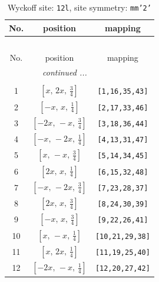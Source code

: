 \documentclass[fleqn,8pt]{jsarticle}
\begin{document}
\begin{longtable}{ccc}
\caption{Wyckoff site: {\tt 12l}, site symmetry: {\tt mm'2'}}
 \\
 \hline \hline
No. & position & mapping \\ \hline \endfirsthead

\multicolumn{2}{l}{\tablename\ \thetable{}} \\
 \hline \hline
No. & position & mapping \\ \hline \endhead

 \hline \hline
\multicolumn{2}{r}{\footnotesize\it continued ...} \\ \endfoot

 \hline \hline
\multicolumn{2}{r}{} \\ \endlastfoot

1 & $\left[ x,\, 2 x,\, \frac{3}{4} \right]$ & {\tt [1,16,35,43]} \\ \hline
2 & $\left[ - x,\, x,\, \frac{1}{4} \right]$ & {\tt [2,17,33,46]} \\ \hline
3 & $\left[ - 2 x,\, - x,\, \frac{3}{4} \right]$ & {\tt [3,18,36,44]} \\ \hline
4 & $\left[ - x,\, - 2 x,\, \frac{1}{4} \right]$ & {\tt [4,13,31,47]} \\ \hline
5 & $\left[ x,\, - x,\, \frac{3}{4} \right]$ & {\tt [5,14,34,45]} \\ \hline
6 & $\left[ 2 x,\, x,\, \frac{1}{4} \right]$ & {\tt [6,15,32,48]} \\ \hline
7 & $\left[ - x,\, - 2 x,\, \frac{3}{4} \right]$ & {\tt [7,23,28,37]} \\ \hline
8 & $\left[ 2 x,\, x,\, \frac{3}{4} \right]$ & {\tt [8,24,30,39]} \\ \hline
9 & $\left[ - x,\, x,\, \frac{3}{4} \right]$ & {\tt [9,22,26,41]} \\ \hline
10 & $\left[ x,\, - x,\, \frac{1}{4} \right]$ & {\tt [10,21,29,38]} \\ \hline
11 & $\left[ x,\, 2 x,\, \frac{1}{4} \right]$ & {\tt [11,19,25,40]} \\ \hline
12 & $\left[ - 2 x,\, - x,\, \frac{1}{4} \right]$ & {\tt [12,20,27,42]} \\
\end{longtable}
\renewcommand{\arraystretch}{1.2}
\end{document}
